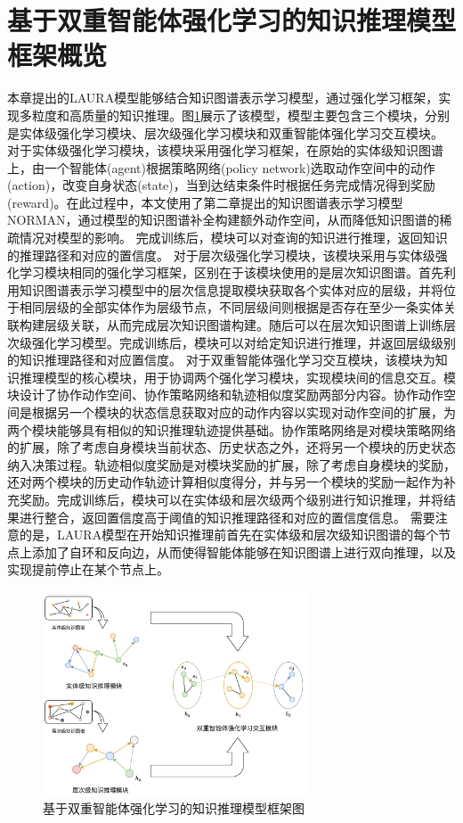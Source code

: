 \documentclass[algorithmlist, AutoFakeBold, AutoFakeSlant, figurelist, tablelist, nomlist, engineering]{seuthesix}
\begin{document}
\section{基于双重智能体强化学习的知识推理模型框架概览}
本章提出的LAURA模型能够结合知识图谱表示学习模型，通过强化学习框架，实现多粒度和高质量的知识推理。图\ref{3_LAURA}展示了该模型，模型主要包含三个模块，分别是实体级强化学习模块、层次级强化学习模块和双重智能体强化学习交互模块。
对于实体级强化学习模块，该模块采用强化学习框架，在原始的实体级知识图谱上，由一个智能体(agent)根据策略网络(policy network)选取动作空间中的动作(action)，改变自身状态(state)，当到达结束条件时根据任务完成情况得到奖励(reward)。在此过程中，本文使用了第二章提出的知识图谱表示学习模型NORMAN，通过模型的知识图谱补全构建额外动作空间，从而降低知识图谱的稀疏情况对模型的影响。
完成训练后，模块可以对查询的知识进行推理，返回知识的推理路径和对应的置信度。
对于层次级强化学习模块，该模块采用与实体级强化学习模块相同的强化学习框架，区别在于该模块使用的是层次知识图谱。首先利用知识图谱表示学习模型中的层次信息提取模块获取各个实体对应的层级，并将位于相同层级的全部实体作为层级节点，不同层级间则根据是否存在至少一条实体关联构建层级关联，从而完成层次知识图谱构建。随后可以在层次知识图谱上训练层次级强化学习模型。完成训练后，模块可以对给定知识进行推理，并返回层级级别的知识推理路径和对应置信度。
对于双重智能体强化学习交互模块，该模块为知识推理模型的核心模块，用于协调两个强化学习模块，实现模块间的信息交互。模块设计了协作动作空间、协作策略网络和轨迹相似度奖励两部分内容。协作动作空间是根据另一个模块的状态信息获取对应的动作内容以实现对动作空间的扩展，为两个模块能够具有相似的知识推理轨迹提供基础。协作策略网络是对模块策略网络的扩展，除了考虑自身模块当前状态、历史状态之外，还将另一个模块的历史状态纳入决策过程。轨迹相似度奖励是对模块奖励的扩展，除了考虑自身模块的奖励，还对两个模块的历史动作轨迹计算相似度得分，并与另一个模块的奖励一起作为补充奖励。完成训练后，模块可以在实体级和层次级两个级别进行知识推理，并将结果进行整合，返回置信度高于阈值的知识推理路径和对应的置信度信息。
需要注意的是，LAURA模型在开始知识推理前首先在实体级和层次级知识图谱的每个节点上添加了自环和反向边，从而使得智能体能够在知识图谱上进行双向推理，以及实现提前停止在某个节点上。
\begin{figure}
  \centering
  \includegraphics[width=0.7\textwidth]{3_LAURA}
  \caption{基于双重智能体强化学习的知识推理模型框架图}
  \label{3_LAURA}
\end{figure}
\end{document}
